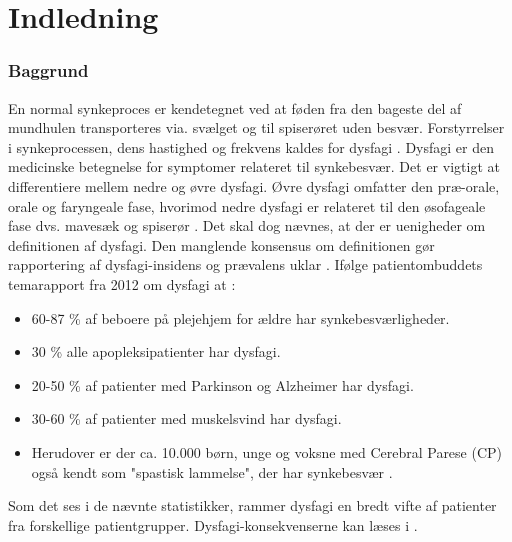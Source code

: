 \chapter{Indledning}

\subsection{Baggrund}
En normal synkeproces er kendetegnet ved at føden  fra den bageste del af mundhulen transporteres via. svælget og til spiserøret uden besvær. Forstyrrelser i synkeprocessen, dens hastighed og frekvens kaldes for dysfagi \cite{Sundhedsstyrelsen2015}. Dysfagi er den medicinske betegnelse for symptomer  relateret til synkebesvær. Det er vigtigt at differentiere mellem nedre og øvre dysfagi. Øvre dysfagi omfatter den præ-orale, orale og faryngeale fase, hvorimod nedre dysfagi er relateret til den øsofageale fase dvs. mavesæk og spiserør \cite{Kjaersgaard2013}. Det skal dog nævnes, at der er uenigheder om definitionen af dysfagi. Den manglende konsensus om definitionen gør rapportering af dysfagi-insidens og prævalens uklar \cite{Kjaersgaard2013}. Ifølge patientombuddets temarapport fra 2012 om dysfagi at \cite{Bommersholdt2012}:

\begin{itemize}
\item 60-87 \% af beboere på plejehjem for ældre har synkebesværligheder.
\item 30 \% alle apopleksipatienter har dysfagi.
\item 20-50 \% af patienter med Parkinson og Alzheimer har dysfagi.
\item 30-60 \% af patienter med muskelsvind har dysfagi.
\item Herudover er der ca. 10.000 børn, unge og voksne med Cerebral Parese (CP) også kendt som "spastisk lammelse", der har synkebesvær . 
\end{itemize}

Som det ses i de nævnte statistikker, rammer dysfagi en bredt vifte af patienter fra forskellige patientgrupper. Dysfagi-konsekvenserne kan læses i . 

